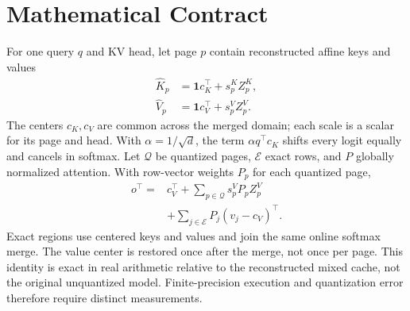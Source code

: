 \documentclass{article}
\begin{document}
\printAffiliationsAndNotice{}

\section{Mathematical Contract}
For one query $q$ and KV head, let page $p$ contain reconstructed affine keys
and values
\begin{align}
 \widehat K_p &= \mathbf 1 c_K^\top+s_p^K Z_p^K,\\
 \widehat V_p &= \mathbf 1 c_V^\top+s_p^V Z_p^V.
\end{align}
The centers $c_K,c_V$ are common across the merged domain; each scale is a
scalar for its page and head. With $\alpha=1/\sqrt d$, the term
$\alpha q^\top c_K$ shifts every logit equally and cancels in softmax.
Let $\mathcal Q$ be quantized pages, $\mathcal E$ exact rows, and $P$ globally
normalized attention. With row-vector weights $P_p$ for each quantized page,
\begin{equation}
\begin{split}
 o^\top={}&c_V^\top+\sum_{p\in\mathcal Q}s_p^V P_p Z_p^V\\
          &+\sum_{j\in\mathcal E}P_j(v_j-c_V)^\top.
\end{split}
\end{equation}
Exact regions use centered keys and values and join the same online softmax
merge. The value center is restored once after the merge, not once per page.
This identity is exact in real arithmetic relative to the reconstructed mixed
cache, not the original unquantized model. Finite-precision execution and
quantization error therefore require distinct measurements.
\end{document}

